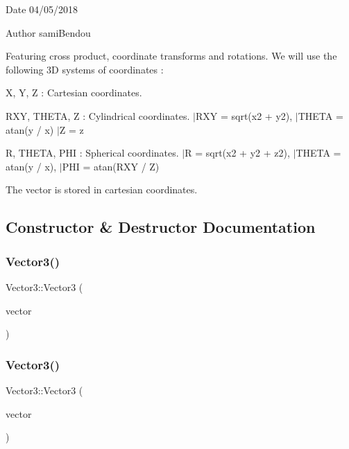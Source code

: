 \begin{DoxyDate}{Date}
04/05/2018 
\end{DoxyDate}
\begin{DoxyAuthor}{Author}
sami\+Bendou
\end{DoxyAuthor}
Featuring cross product, coordinate transforms and rotations. We will use the following 3D systems of coordinates \+:


\begin{DoxyItemize}
\item X, Y, Z \+: Cartesian coordinates.
\item R\+XY, T\+H\+E\+TA, Z \+: Cylindrical coordinates. $\vert$\+R\+XY = sqrt(x2 + y2), $\vert$\+T\+H\+E\+TA = atan(y / x) $\vert$Z = z
\item R, T\+H\+E\+TA, P\+HI \+: Spherical coordinates. $\vert$R = sqrt(x2 + y2 + z2), $\vert$\+T\+H\+E\+TA = atan(y / x), $\vert$\+P\+HI = atan(R\+XY / Z)
\end{DoxyItemize}

The vector is stored in cartesian coordinates. 

\subsection{Constructor \& Destructor Documentation}
\mbox{\label{class_vector3_a7f0648c3ba70beccd1b820bf9a55b97e}} 
\subsubsection{\texorpdfstring{Vector3()}{Vector3()}\hspace{0.1cm}{\footnotesize\ttfamily [1/3]}}
{\footnotesize\ttfamily Vector3\+::\+Vector3 (\begin{DoxyParamCaption}\item[{const \mbox{\hyperlink{class_n_vector}{N\+Vector}}$<$ double $>$ \&}]{vector }\end{DoxyParamCaption})}

\mbox{\label{class_vector3_a7d08ef6fb4d8a4f078ed34c60422a9bf}} 
\subsubsection{\texorpdfstring{Vector3()}{Vector3()}\hspace{0.1cm}{\footnotesize\ttfamily [2/3]}}
{\footnotesize\ttfamily Vector3\+::\+Vector3 (\begin{DoxyParamCaption}\item[{const \mbox{\hyperlink{class_vector3}{Vector3}} \&}]{vector }\end{DoxyParamCaption})\hspace{0.3cm}{\ttfamily [default]}}

